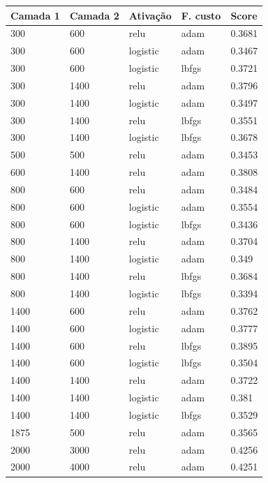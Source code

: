 \documentclass[conference]{IEEEtran}
\begin{document}
\begin{center}
\begin{tabular}{| l | l | l | l | l |}
 \hline
\textbf{Camada 1} & \textbf{Camada 2} & \textbf{Ativação} & \textbf{F. custo} & \textbf{Score}  \\  \hline
300  & 600  & relu     & adam  & 0.3681 \\ \hline
300  & 600  & logistic & adam  & 0.3467 \\ \hline
300  & 600  & logistic & lbfgs & 0.3721 \\ \hline
300  & 1400 & relu     & adam  & 0.3796 \\ \hline
300  & 1400 & logistic & adam  & 0.3497 \\ \hline
300  & 1400 & relu     & lbfgs & 0.3551 \\ \hline
300  & 1400 & logistic & lbfgs & 0.3678 \\ \hline
500  & 500  & relu     & adam  & 0.3453  \\ \hline
600  & 1400 & relu     & adam  & 0.3808  \\ \hline
800  & 600  & relu     & adam  & 0.3484 \\ \hline
800  & 600  & logistic & adam  & 0.3554  \\ \hline
800  & 600  & logistic & lbfgs & 0.3436  \\ \hline
800  & 1400 & relu     & adam  & 0.3704  \\ \hline
800  & 1400 & logistic & adam  & 0.349     \\ \hline
800  & 1400 & relu     & lbfgs & 0.3684  \\ \hline
800  & 1400 & logistic & lbfgs & 0.3394  \\ \hline
1400 & 600  & relu     & adam  & 0.3762  \\ \hline
1400 & 600  & logistic & adam  & 0.3777  \\ \hline
1400 & 600  & relu     & lbfgs & 0.3895  \\ \hline
1400 & 600  & logistic & lbfgs & 0.3504  \\ \hline
1400 & 1400 & relu     & adam  & 0.3722  \\ \hline
1400 & 1400 & logistic & adam  & 0.381     \\ \hline
1400 & 1400 & logistic & lbfgs & 0.3529  \\ \hline
1875 & 500  & relu     & adam  & 0.3565  \\ \hline
2000 & 3000 & relu     & adam  & 0.4256  \\ \hline
2000 & 4000 & relu     & adam  & 0.4251  \\ \hline

\end{tabular}
\end{center}
\end{document}
